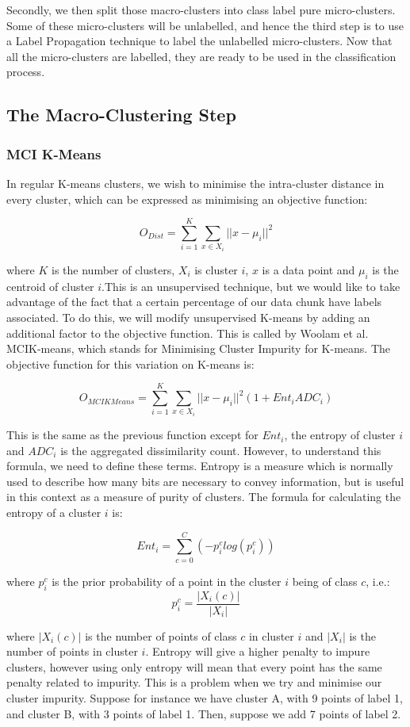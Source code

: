 \documentclass[12pt,a4paper,oneside]{report}
\begin{document}
Secondly, we then split those macro-clusters into class label pure micro-clusters. Some of these micro-clusters will be unlabelled, and hence the third step is to use a Label Propagation technique to label the unlabelled micro-clusters. Now that all the micro-clusters are labelled, they are ready to be used in the classification process. 

\subsection{The Macro-Clustering Step}

\subsubsection{MCI K-Means}
 In regular K-means clusters, we wish to minimise the intra-cluster distance in every cluster, which can be expressed  as minimising an objective function: 
 
 \[ O_{Dist} = \sum_{i=1}^K \sum_{x\in X_i}|| x - \mu_i||^2 \]
 
where $K$ is the number of clusters, $X_i$ is cluster $i$, $x$ is a data point and $\mu_i$ is the centroid of cluster $i$.This is an unsupervised technique, but we would like to take advantage of the fact that a certain percentage of our data chunk have labels associated. To do this, we will modify unsupervised K-means by adding an additional factor to the objective function. This is called by Woolam et al. MCIK-means, which stands for Minimising Cluster Impurity for K-means. \cite{LabStr} The objective function for this variation on K-means is:
 
 \[ O_{MCIKMeans} = \sum_{i=1}^K \sum_{x\in X_i}|| x - \mu_i||^2(1 + Ent_iADC_i)\]

This is the same as the previous function except for $Ent_i$, the entropy of cluster $i$ and $ADC_i$ is the aggregated dissimilarity count. However, to understand this formula, we need to define these terms. 
Entropy is a measure which is normally used to describe how many bits are necessary to convey information, but is useful in this context as a measure of purity of clusters. The formula for calculating the entropy of a cluster \(i\) is:
 
\[Ent_i = \sum_{c=0}^C(-p_i^clog(p_i^c))\] 

where \(p_i^c\) is the prior probability of a point in the cluster \(i\) being of class \(c\), i.e.:
\[p_i^c = \frac{|X_i(c)|}{|X_i|}\] 

where $|X_i(c)|$ is the number of points of class $c$ in cluster $i$ and $|X_i|$ is the number of points in cluster $i$. 
Entropy will give a higher penalty to impure clusters, however using only entropy will mean that every point has the same penalty related to impurity. This is a problem when we try and minimise our cluster impurity. Suppose for instance we have cluster A, with 9 points of label 1, and cluster B, with 3 points of label 1. Then, suppose we add 7 points of label 2. 
\end{document}
